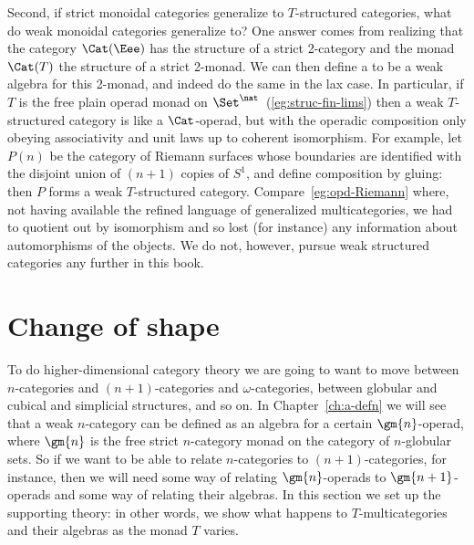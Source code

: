 Second, if strict monoidal categories generalize to $T$-structured
categories, what do weak monoidal categories generalize to?  One answer
comes from realizing that the category $\Cat(\Eee)$ has the structure of a
strict 2-category and the monad $\Cat(T)$ the structure of a strict
2-monad.  We can then define a  to be a
weak algebra for this 2-monad, and indeed do the same in the lax case.  In
particular, if $T$ is the free plain operad monad on
$\Set^\nat$~(\ref{eg:struc-fin-lims}) then a weak $T$-structured category is
like a $\Cat$-operad,%
%
%
but with the operadic composition only obeying
associativity and unit laws up to coherent isomorphism.  For example, let
$P(n)$ be the category of Riemann%
%
%
%
%
surfaces whose boundaries are identified
with the disjoint union of $(n+1)$ copies of $S^1$, and define composition
by gluing: then $P$ forms a weak $T$-structured category.
Compare~\ref{eg:opd-Riemann} where, not having available the refined
language of generalized multicategories, we had to quotient out by
isomorphism and so lost (for instance) any information about automorphisms
of the objects.  We do not, however, pursue weak structured categories any
further in this book.%
%
%
%
%
%








\section{Change of shape}
%
%
%
%
%

To do higher-dimensional category theory we are going to want to move%
%
%
between $n$-categories and $(n+1)$-categories and $\omega$-categories,
between globular and cubical and simplicial structures, and so on.  In
Chapter~\ref{ch:a-defn} we will see that a weak $n$-category can be defined
as an algebra for a certain $\gm{n}$-operad, where $\gm{n}$ is the free
strict $n$-category monad on the category of $n$-globular sets.  So if we
want to be able to relate $n$-categories to $(n+1)$-categories, for
instance, then we will need some way of relating $\gm{n}$-operads to
$\gm{n+1}$-operads and some way of relating their algebras.  In this
section we set up the supporting theory: in other words, we show what
happens to $T$-multicategories and their algebras as the monad $T$
varies.

